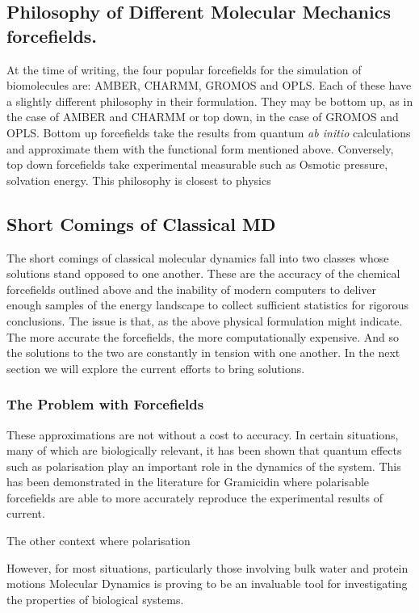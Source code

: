 \subsection{Philosophy of Different Molecular Mechanics forcefields.}
At the time of writing, the four popular forcefields for the simulation of biomolecules are: AMBER, CHARMM, GROMOS and OPLS. Each of these have a slightly different philosophy in their formulation. They may be bottom up, as in the case of AMBER and CHARMM or top down, in the case of GROMOS and OPLS. Bottom up forcefields take the results from quantum \textit{ab initio} calculations and approximate them with the functional form mentioned above. Conversely, top down forcefields take experimental measurable such as Osmotic pressure, solvation energy. This philosophy is closest to physics 


\subsection{Short Comings of Classical MD}
The short comings of classical molecular dynamics fall into two classes whose solutions stand opposed to one another. These are the accuracy of the chemical forcefields outlined above and the inability of modern computers to deliver enough samples of the energy landscape to collect sufficient statistics for rigorous conclusions. The issue is that, as the above physical formulation might indicate. The more accurate the forcefields, the more computationally expensive. And so the solutions to the two are constantly in tension with one another. In the next section we will explore the current efforts to bring solutions.

\subsubsection{The Problem with Forcefields}
These approximations are not without a cost to accuracy. In certain situations, many of which are biologically relevant, it has been shown that quantum effects such as polarisation play an important role in the dynamics of the system. This has been demonstrated in the literature for Gramicidin where polarisable forcefields are able to more accurately reproduce the experimental results of current.

The other context where polarisation 

However, for most situations, particularly those involving bulk water and protein motions Molecular Dynamics is proving to be an invaluable tool for investigating the properties of biological systems.  

